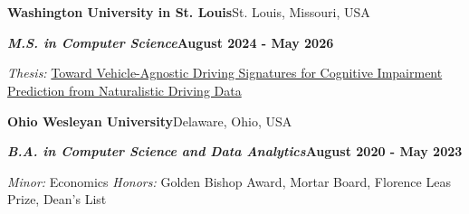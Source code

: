 \documentclass[10pt, letterpaper]{article}
\renewenvironment{educationentry}[4]{%
    \vspace{\entrySpacing}
    \needspace{7\baselineskip}%
    \noindent\textbf{#1}\hfill #4\par
    \vspace{\highlightSpacing}
    \noindent\textbf{\textit{#3}}\hfill \textbf{#2}\par
    \vspace{\highlightSpacing}
    \noindent\ignorespaces
}{%
    \par
}
\begin{document}
\section{}

\vspace{\entrySpacing}
\begin{educationentry}
	{Washington University in St. Louis}
	{August 2024 - May 2026}
	{M.S. in Computer Science}
	{St. Louis, Missouri, USA}
\begin{highlightsforbulletentries}
\item \textit{Thesis:} \href{https://doi.org/10.7936/g95n-fv35}{Toward Vehicle-Agnostic Driving Signatures for Cognitive Impairment Prediction from Naturalistic Driving Data}
\end{highlightsforbulletentries}
\end{educationentry}

\vspace{\entrySpacing}
\begin{educationentry}
	{Ohio Wesleyan University}
	{August 2020 - May 2023}
	{B.A. in Computer Science and Data Analytics}
	{Delaware, Ohio, USA}
\begin{highlightsforbulletentries}
\item \textit{Minor:} Economics \textbar{} \textit{Honors:} Golden Bishop Award, Mortar Board, Florence Leas Prize, Dean's List
\end{highlightsforbulletentries}
\end{educationentry}

\end{document}
